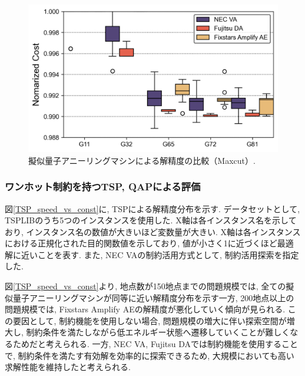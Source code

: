 \documentclass[submit,techrep,noauthor]{ipsj}
\begin{document}
\begin{figure}[t]
\centering
\includegraphics[bb=0 0 700 250, width=15cm]{speed_vs_constraint_Maxcut.png}
\caption{擬似量子アニーリングマシンによる解精度の比較（Maxcut）.}
\label{Maxcut_speed_vs_const}
\end{figure}

\subsubsection{ワンホット制約を持つTSP, QAPによる評価}
図\ref{TSP_speed_vs_const}に, TSPによる解精度分布を示す. データセットとして, TSPLIB\cite{tsplib}のうち5つのインスタンスを使用した. X軸は各インスタンス名を示しており, インスタンス名の数値が大きいほど変数量が大きい. X軸は各インスタンスにおける正規化された目的関数値を示しており, 値が小さく1に近づくほど最適解に近いことを表す. また, NEC VAの制約活用方式として, 制約活用探索を指定した. 

図\ref{TSP_speed_vs_const}より, 地点数が150地点までの問題規模では, 全ての擬似量子アニーリングマシンが同等に近い解精度分布を示す一方, 200地点以上の問題規模では, Fixstars Amplify AEの解精度が悪化していく傾向が見られる. この要因として, 制約機能を使用しない場合, 問題規模の増大に伴い探索空間が増大し, 制約条件を満たしながら低エネルギー状態へ遷移していくことが難しくなるためだと考えられる. 一方, NEC VA, Fujitsu DAでは制約機能を使用することで, 制約条件を満たす有効解を効率的に探索できるため, 大規模においても高い求解性能を維持したと考えられる. 

\end{document}
